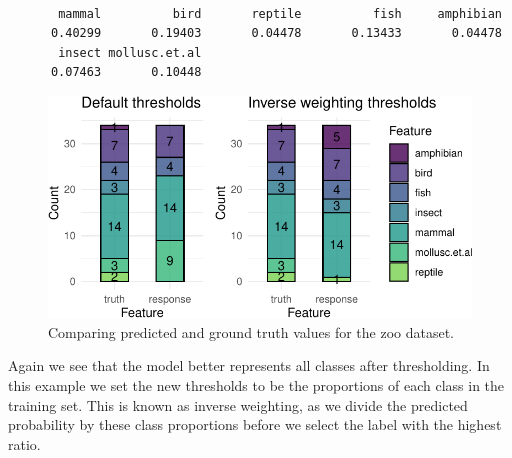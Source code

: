 \begin{verbatim}

       mammal          bird       reptile          fish     amphibian 
      0.40299       0.19403       0.04478       0.13433       0.04478 
       insect mollusc.et.al 
      0.07463       0.10448 
\end{verbatim}

\begin{Shaded}
\begin{Highlighting}[]
\SpecialCharTok{$}
\OtherTok{=} \SpecialCharTok{+} \NormalTok{(}\NormalTok{)}
\SpecialCharTok{+}\SpecialCharTok{+} \NormalTok{(} \NormalTok{)}
\end{Highlighting}
\end{Shaded}

\begin{figure}[H]

{\centering \includegraphics[width=1\textwidth,height=\textheight]{chapters/chapter2/data_and_basic_modeling_files/figure-pdf/fig-zoopreds-1.pdf}

}

\caption{\label{fig-zoopreds}Comparing predicted and ground truth values
for the zoo dataset.}

\end{figure}

Again we see that the model better represents all classes after
thresholding. In this example we set the new thresholds to be the
proportions of each class in the training set. This is known as inverse
weighting, as we divide the predicted
probability by these class proportions before we select the label with
the highest ratio.

